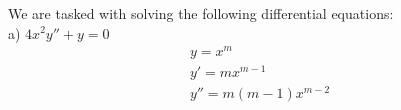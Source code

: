 \documentclass{article}
\begin{document}
\setcounter{subsection}{7}
\setcounter{subsubsection}{0}
\subsubsection{}
We are tasked with solving the following differential equations: \\
a) $4x^2y'' + y= 0$
\begin{align*}
    y = x^m \\
    y' = mx^{m-1} \\
    y'' = m(m-1)x^{m-2}
\end{align*}
\end{document}
